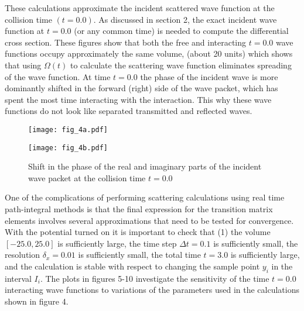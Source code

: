 \documentclass[aps,prc,reprint,noshowpacs,groupedaddress,onecolumn]{revtex4}
\begin{document}
These calculations approximate the incident scattered
wave function at the collision time $(t=0.0)$.
As discussed in section 2, the exact incident wave function at $t=0.0$
(or any common time) is needed to compute the differential cross section.  These
figures show that both the free and interacting $t=0.0$ wave
functions occupy approximately the same volume, (about 20 units) which
shows that using $\Omega(t)$ to calculate the scattering wave function
eliminates spreading of the wave function.
At time $t=0.0$ the phase of the incident wave is more
dominantly shifted in the forward (right) side of the wave packet, which
has spent the most time interacting with the interaction.
This why these wave
functions do not look like separated transmitted and reflected waves.
\begin{figure}
\caption{Shift in the phase of the real and imaginary parts of the incident wave packet at the collision time $t=0.0$}
\begin{minipage}[t]{.45\linewidth}
\centering
\texttt{[image: fig\_4a.pdf]}
\end{minipage}
\begin{minipage}[t]{.45\linewidth}
\centering
\texttt{[image: fig\_4b.pdf]}
\end{minipage}
\label{figure 4}
\end{figure}  

One of the complications of performing scattering calculations using
real time path-integral methods is that the final expression for the
transition matrix elements involves several approximations that
need to be tested for convergence.
With the potential turned on it is important to check that (1) the
volume $[-25.0,25.0]$ is sufficiently large, the time step $\Delta t=0.1$
is sufficiently small, the resolution $\delta_x=0.01$ is sufficiently
small, the total time $t=3.0$ is sufficiently large,  and the calculation
is stable with respect to changing the sample point $y_i$ in the
interval $I_i$.  The plots in figures 5-10 investigate the sensitivity 
of the time $t=0.0$ interacting wave functions to variations of the
parameters used in the calculations shown in figure 4.
\end{document}
